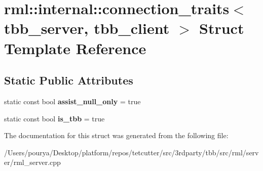 \hypertarget{structrml_1_1internal_1_1connection__traits_3_01tbb__server_00_01tbb__client_01_4}{}\section{rml\+:\+:internal\+:\+:connection\+\_\+traits$<$ tbb\+\_\+server, tbb\+\_\+client $>$ Struct Template Reference}
\label{structrml_1_1internal_1_1connection__traits_3_01tbb__server_00_01tbb__client_01_4}
\subsection*{Static Public Attributes}
\begin{DoxyCompactItemize}
\item 
\hypertarget{structrml_1_1internal_1_1connection__traits_3_01tbb__server_00_01tbb__client_01_4_a0f0725f475fdb50254fff0fdfb7f0bfe}{}static const bool {\bfseries assist\+\_\+null\+\_\+only} = true\label{structrml_1_1internal_1_1connection__traits_3_01tbb__server_00_01tbb__client_01_4_a0f0725f475fdb50254fff0fdfb7f0bfe}

\item 
\hypertarget{structrml_1_1internal_1_1connection__traits_3_01tbb__server_00_01tbb__client_01_4_aa07d970ecbcc62326d0da9461f84fae9}{}static const bool {\bfseries is\+\_\+tbb} = true\label{structrml_1_1internal_1_1connection__traits_3_01tbb__server_00_01tbb__client_01_4_aa07d970ecbcc62326d0da9461f84fae9}

\end{DoxyCompactItemize}


The documentation for this struct was generated from the following file\+:\begin{DoxyCompactItemize}
\item 
/\+Users/pourya/\+Desktop/platform/repos/tetcutter/src/3rdparty/tbb/src/rml/server/rml\+\_\+server.\+cpp\end{DoxyCompactItemize}
